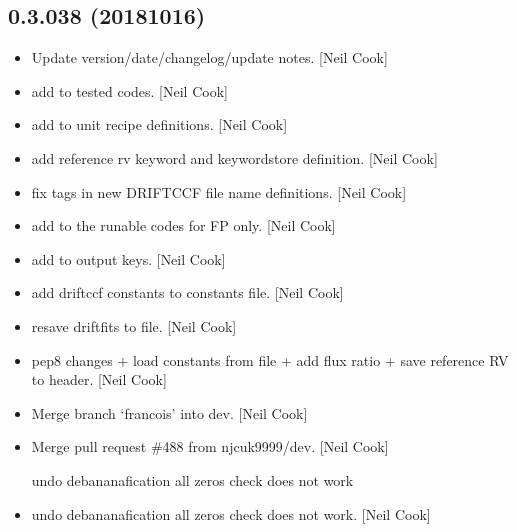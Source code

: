 \documentclass[a4paper,10pt,english]{report}
\begin{document}
\subsection{0.3.038 (2018\sphinxhyphen{}10\sphinxhyphen{}16)}
\label{\detokenize{misc/changelog:id311}}\begin{itemize}
\item {} 
Update version/date/changelog/update notes. {[}Neil Cook{]}

\item {} 
 \sphinxhyphen{} add  to tested codes. {[}Neil
Cook{]}

\item {} 
 \sphinxhyphen{} add  to unit recipe
definitions. {[}Neil Cook{]}

\item {} 
 \sphinxhyphen{} add reference rv keyword and keywordstore
definition. {[}Neil Cook{]}

\item {} 
 \sphinxhyphen{} fix tags in new DRIFTCCF file name definitions. {[}Neil
Cook{]}

\item {} 
 \sphinxhyphen{} add  to the runable codes
\sphinxhyphen{} for FP only. {[}Neil Cook{]}

\item {} 
 \sphinxhyphen{} add  to output keys. {[}Neil
Cook{]}

\item {} 
 \sphinxhyphen{} add driftccf constants to constants file.
{[}Neil Cook{]}

\item {} 
 \sphinxhyphen{} re\sphinxhyphen{}save driftfits to file. {[}Neil Cook{]}

\item {} 
 \sphinxhyphen{} pep8 changes + load constants from file
+ add flux ratio + save reference RV to header. {[}Neil Cook{]}

\item {} 
Merge branch ‘francois’ into dev. {[}Neil Cook{]}

\item {} 
Merge pull request \#488 from njcuk9999/dev. {[}Neil Cook{]}

 \sphinxhyphen{} undo debananafication all zeros check \sphinxhyphen{} does not work

\item {} 
 \sphinxhyphen{} undo debananafication all zeros check \sphinxhyphen{} does not
work. {[}Neil Cook{]}

\end{itemize}
\end{document}
